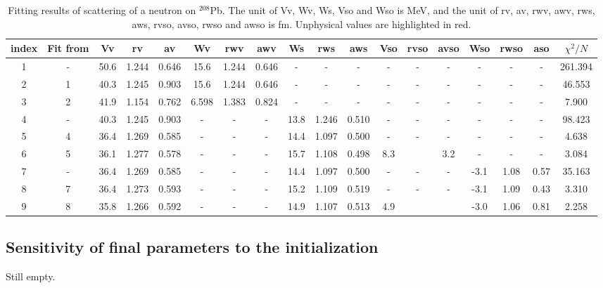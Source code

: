 \begin{landscape}
\begin{table}[b]
	\centering
	\caption{Fitting results of scattering of a neutron on $^{208}$Pb. 
			The unit of Vv, Wv, Ws, Vso and Wso is MeV, and the unit of rv, av, rwv, awv, rws, aws, rvso, avso, rwso and awso is fm. 
			Unphysical values are highlighted in red. }
	\label{neutron_table}
	\footnotesize
	\begin{tabular}{cccccccccccccccccc}
		\hline
		\hline
		index & Fit from & Vv   & rv    & av    & Wv    & rwv   & awv   & Ws   & rws   & aws   & Vso & rvso  & avso & Wso   & rwso & aso  & $\chi^2/N$ \\
		\hline
		1     & -        & 50.6 & 1.244 & 0.646 & 15.6  & 1.244 & 0.646 & -    & -     & -     & -   & -     & -    & -     & -    & -    & 261.394    \\
		2     & 1        & 40.3 & 1.245 & 0.903 & 15.6  & 1.244 & 0.646 & -    & -     & -     & -   & -     & -    & -     & -    & -    & 46.553     \\
		3     & 2        & 41.9 & 1.154 & 0.762 & 6.598 & 1.383 & 0.824 & -    & -     & -     & -   & -     & -    & -     & -    & -    & 7.900      \\
		4     & -        & 40.3 & 1.245 & 0.903 & -     & -     & -     & 13.8 & 1.246 & 0.510 & -   & -     & -    & -     & -    & -    & 98.423     \\
		5     & 4        & 36.4 & 1.269 & 0.585 & -     & -     & -     & 14.4 & 1.097 & 0.500 & -   & -     & -    & -     & -    & -    & 4.638      \\
		6     & 5        & 36.1 & 1.277 & 0.578 & -     & -     & -     & 15.7 & 1.108 & 0.498 & 8.3 & \color{red}{-4.3} & 3.2 & -     & -    & -    & 3.084      \\
		7     & -        & 36.4 & 1.269 & 0.585 & -     & -     & -     & 14.4 & 1.097 & 0.500 & -   & -     & -    & -3.1 & 1.08 & 0.57 & 35.163     \\
		8     & 7        & 36.4 & 1.273 & 0.593 & -     & -     & -     & 15.2 & 1.109 & 0.519 & -   & -     & -    & -3.1 & 1.09 & 0.43 & 3.310      \\
		9     & 8        & 35.8 & 1.266 & 0.592 & -     & -     & -     & 14.9 & 1.107 & 0.513 & 4.9 & \color{red}{1.03}  & \color{red}{1.23} & -3.0 & 1.06 & 0.81 & 2.258      \\
		\hline
		\hline
	\end{tabular}
\end{table}
\end{landscape}

\subsection{Sensitivity of final parameters to the initialization}
Still empty. 
